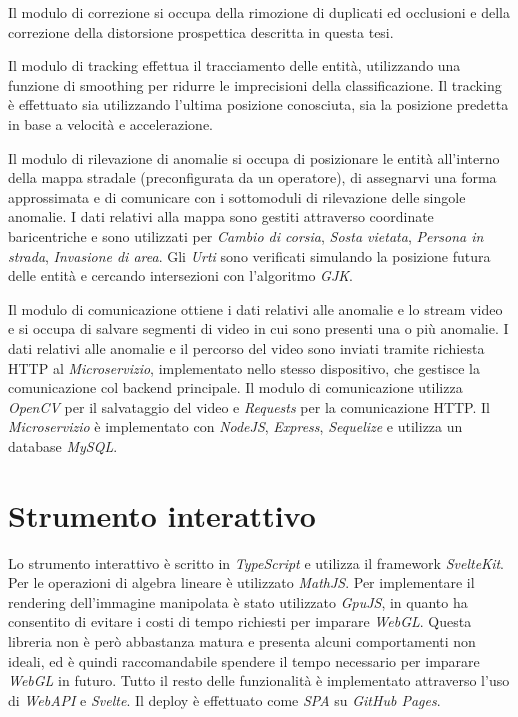 Il modulo di correzione si occupa della rimozione di duplicati ed occlusioni e della correzione della distorsione prospettica descritta in questa tesi.

Il modulo di tracking effettua il tracciamento delle entità, utilizzando una funzione di smoothing per ridurre le imprecisioni della classificazione.
Il tracking è effettuato sia utilizzando l'ultima posizione conosciuta, sia la posizione predetta in base a velocità e accelerazione.

Il modulo di rilevazione di anomalie si occupa di posizionare le entità all'interno della mappa stradale (preconfigurata da un operatore), di assegnarvi una forma approssimata e di comunicare con i sottomoduli di rilevazione delle singole anomalie.
I dati relativi alla mappa sono gestiti attraverso coordinate baricentriche e sono utilizzati per \emph{Cambio di corsia}, \emph{Sosta vietata}, \emph{Persona in strada}, \emph{Invasione di area}.
Gli \emph{Urti} sono verificati simulando la posizione futura delle entità e cercando intersezioni con l'algoritmo \emph{GJK}\cite{arch:gjk}.

Il modulo di comunicazione ottiene i dati relativi alle anomalie e lo stream video e si occupa di salvare segmenti di video in cui sono presenti una o più anomalie.
I dati relativi alle anomalie e il percorso del video sono inviati tramite richiesta HTTP al \emph{Microservizio}, implementato nello stesso dispositivo, che gestisce la comunicazione col backend principale.
Il modulo di comunicazione utilizza \emph{OpenCV}\cite{arch:opencv} per il salvataggio del video e \emph{Requests}\cite{arch:requests} per la comunicazione HTTP.
Il \emph{Microservizio} è implementato con \emph{NodeJS}\cite{arch:nodejs}, \emph{Express}\cite{arch:express}, \emph{Sequelize}\cite{arch:sequelize} e utilizza un database \emph{MySQL}\cite{arch:mysql}.

\section{Strumento interattivo}
Lo strumento interattivo è scritto in \emph{TypeScript}\cite{arch:typescript} e utilizza il framework \emph{SvelteKit}\cite{arch:sveltekit}.
Per le operazioni di algebra lineare è utilizzato \emph{MathJS}\cite{arch:mathjs}.
Per implementare il rendering dell'immagine manipolata è stato utilizzato \emph{GpuJS}\cite{arch:gpujs}, in quanto ha consentito di evitare i costi di tempo richiesti per imparare \emph{WebGL}\cite{arch:webgl}.
Questa libreria non è però abbastanza matura e presenta alcuni comportamenti non ideali, ed è quindi raccomandabile spendere il tempo necessario per imparare \emph{WebGL} in futuro.
Tutto il resto delle funzionalità è implementato attraverso l'uso di \emph{WebAPI}\cite{arch:webapi} e \emph{Svelte}\cite{arch:svelte}.
Il deploy è effettuato come \emph{SPA}\cite{arch:spa} su \emph{GitHub Pages}\cite{arch:ghpages}.
